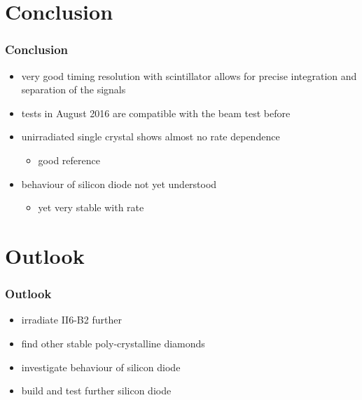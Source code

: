 \documentclass[9pt]{beamer}
\begin{document}
\section{Conclusion}
\begin{frame}
	\frametitle{Conclusion}
	\begin{itemize}
		\setlength{\itemsep}{\fill}
		\item very good timing resolution with scintillator allows for precise integration and separation of the signals
		\item tests in August 2016 are compatible with the beam test before
		\item unirradiated single crystal shows almost no rate dependence
		\begin{itemize}
			\item good reference
		\end{itemize}
		\item behaviour of silicon diode not yet understood
		\begin{itemize}
			\item yet very stable with rate
		\end{itemize}
	\end{itemize}
\end{frame}
\section{Outlook}
\begin{frame}
	\frametitle{Outlook}
	\begin{itemize}
		\setlength{\itemsep}{\fill}
		\item irradiate II6-B2 further 
		\item find other stable poly-crystalline diamonds
		\item investigate behaviour of silicon diode
		\item build and test further silicon diode
	\end{itemize}
\end{frame}
\end{document}
